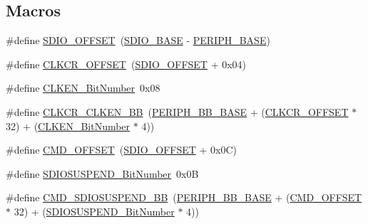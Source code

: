 \subsection*{Macros}
\begin{DoxyCompactItemize}
\item 
\#define \hyperlink{group___s_d_i_o___private___types_definitions_gabf07aced03df5f46d57cea1d4f56d1e3}{S\+D\+I\+O\+\_\+\+O\+F\+F\+S\+ET}~(\hyperlink{openmotestm_2library_2inc_2stm32f10x__map_8h_a95dd0abbc6767893b4b02935fa846f52}{S\+D\+I\+O\+\_\+\+B\+A\+SE} -\/ \hyperlink{openmotestm_2library_2inc_2stm32f10x__map_8h_a9171f49478fa86d932f89e78e73b88b0}{P\+E\+R\+I\+P\+H\+\_\+\+B\+A\+SE})
\item 
\#define \hyperlink{group___s_d_i_o___private___types_definitions_gac5d642be874338519fdec175204ca8ed}{C\+L\+K\+C\+R\+\_\+\+O\+F\+F\+S\+ET}~(\hyperlink{openmotestm_2library_2src_2stm32f10x__sdio_8c_abf07aced03df5f46d57cea1d4f56d1e3}{S\+D\+I\+O\+\_\+\+O\+F\+F\+S\+ET} + 0x04)
\item 
\#define \hyperlink{group___s_d_i_o___private___types_definitions_ga6ad1da47f9d84c54eb620b9231ebec86}{C\+L\+K\+E\+N\+\_\+\+Bit\+Number}~0x08
\item 
\#define \hyperlink{group___s_d_i_o___private___types_definitions_gabfb5772b9b734972b576309f7ca8bf92}{C\+L\+K\+C\+R\+\_\+\+C\+L\+K\+E\+N\+\_\+\+BB}~(\hyperlink{openmotestm_2library_2inc_2stm32f10x__map_8h_aed7efc100877000845c236ccdc9e144a}{P\+E\+R\+I\+P\+H\+\_\+\+B\+B\+\_\+\+B\+A\+SE} + (\hyperlink{openmotestm_2library_2src_2stm32f10x__sdio_8c_ac5d642be874338519fdec175204ca8ed}{C\+L\+K\+C\+R\+\_\+\+O\+F\+F\+S\+ET} $\ast$ 32) + (\hyperlink{openmotestm_2library_2src_2stm32f10x__sdio_8c_a6ad1da47f9d84c54eb620b9231ebec86}{C\+L\+K\+E\+N\+\_\+\+Bit\+Number} $\ast$ 4))
\item 
\#define \hyperlink{group___s_d_i_o___private___types_definitions_gaf12d26702ce7a88d2a3dae87f000b75e}{C\+M\+D\+\_\+\+O\+F\+F\+S\+ET}~(\hyperlink{openmotestm_2library_2src_2stm32f10x__sdio_8c_abf07aced03df5f46d57cea1d4f56d1e3}{S\+D\+I\+O\+\_\+\+O\+F\+F\+S\+ET} + 0x0\+C)
\item 
\#define \hyperlink{group___s_d_i_o___private___types_definitions_gaf88f03a42d76974b55dfb8bda65ade97}{S\+D\+I\+O\+S\+U\+S\+P\+E\+N\+D\+\_\+\+Bit\+Number}~0x0B
\item 
\#define \hyperlink{group___s_d_i_o___private___types_definitions_ga931e48aa282e2a937308f57f807e0781}{C\+M\+D\+\_\+\+S\+D\+I\+O\+S\+U\+S\+P\+E\+N\+D\+\_\+\+BB}~(\hyperlink{openmotestm_2library_2inc_2stm32f10x__map_8h_aed7efc100877000845c236ccdc9e144a}{P\+E\+R\+I\+P\+H\+\_\+\+B\+B\+\_\+\+B\+A\+SE} + (\hyperlink{openmotestm_2library_2src_2stm32f10x__sdio_8c_af12d26702ce7a88d2a3dae87f000b75e}{C\+M\+D\+\_\+\+O\+F\+F\+S\+ET} $\ast$ 32) + (\hyperlink{openmotestm_2library_2src_2stm32f10x__sdio_8c_af88f03a42d76974b55dfb8bda65ade97}{S\+D\+I\+O\+S\+U\+S\+P\+E\+N\+D\+\_\+\+Bit\+Number} $\ast$ 4))

\end{DoxyCompactItemize}
